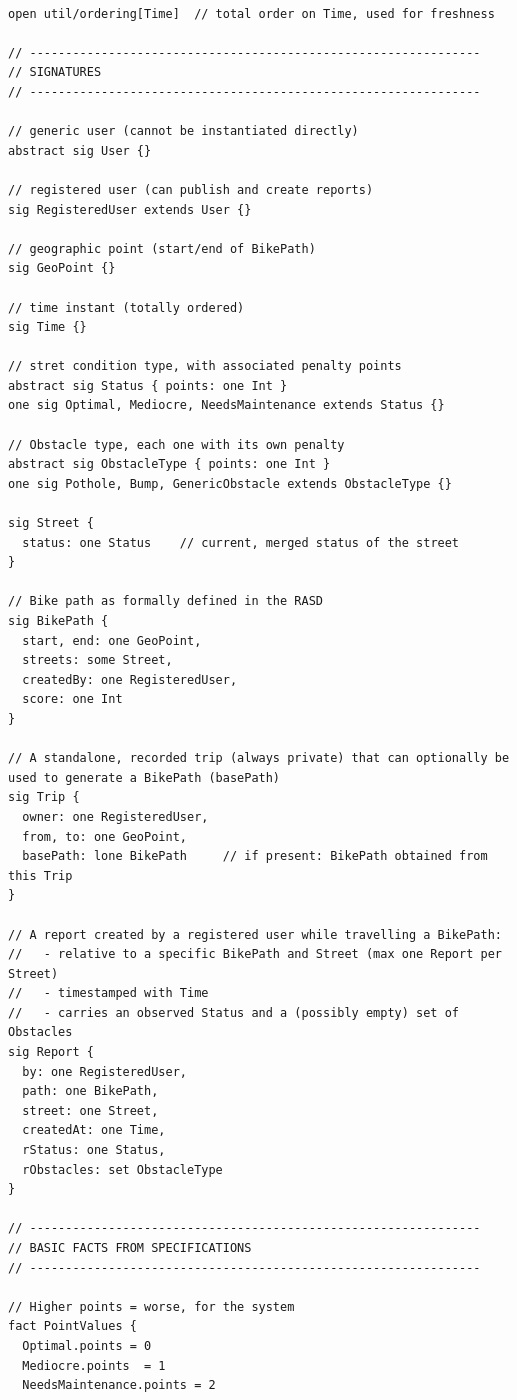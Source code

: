 \documentclass{Configuration_Files/PoliMi3i_thesis}
\begin{document}
\begin{verbatim}

open util/ordering[Time]  // total order on Time, used for freshness

// ---------------------------------------------------------------
// SIGNATURES
// ---------------------------------------------------------------

// generic user (cannot be instantiated directly)
abstract sig User {}

// registered user (can publish and create reports)
sig RegisteredUser extends User {}

// geographic point (start/end of BikePath)
sig GeoPoint {}

// time instant (totally ordered)
sig Time {}

// stret condition type, with associated penalty points
abstract sig Status { points: one Int }
one sig Optimal, Mediocre, NeedsMaintenance extends Status {}

// Obstacle type, each one with its own penalty
abstract sig ObstacleType { points: one Int }
one sig Pothole, Bump, GenericObstacle extends ObstacleType {}

sig Street {
  status: one Status    // current, merged status of the street
}

// Bike path as formally defined in the RASD
sig BikePath {
  start, end: one GeoPoint,
  streets: some Street,
  createdBy: one RegisteredUser,
  score: one Int
}

// A standalone, recorded trip (always private) that can optionally be used to generate a BikePath (basePath)
sig Trip {
  owner: one RegisteredUser,
  from, to: one GeoPoint,
  basePath: lone BikePath     // if present: BikePath obtained from this Trip
}

// A report created by a registered user while travelling a BikePath:
//   - relative to a specific BikePath and Street (max one Report per Street)
//   - timestamped with Time
//   - carries an observed Status and a (possibly empty) set of Obstacles
sig Report {
  by: one RegisteredUser, 
  path: one BikePath, 
  street: one Street,
  createdAt: one Time,
  rStatus: one Status,
  rObstacles: set ObstacleType
}

// ---------------------------------------------------------------
// BASIC FACTS FROM SPECIFICATIONS
// ---------------------------------------------------------------

// Higher points = worse, for the system
fact PointValues {
  Optimal.points = 0
  Mediocre.points  = 1
  NeedsMaintenance.points = 2


\end{verbatim}
\end{document}
